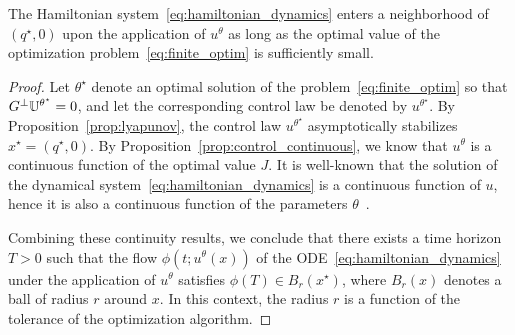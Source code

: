 \begin{prop}
    The Hamiltonian system~\eqref{eq:hamiltonian_dynamics} enters a neighborhood
    of $(q^\star, 0)$ upon the application of $u^\theta$ as long as the optimal
    value of the optimization problem~\eqref{eq:finite_optim} is sufficiently small.
    \label{prop:continuity_neighborhood}
\end{prop}

\begin{proof}
    Let $\theta^\star$ denote an optimal solution of the
    problem~\eqref{eq:finite_optim} so that $G^{\perp} \mathbb{U}^{\theta^\star} = 0$,
    and let the corresponding control law be denoted by $u^{\theta^\star}$.
    By Proposition~\ref{prop:lyapunov}, the control law $u^{\theta^\star}$
    asymptotically stabilizes $x^\star = (q^\star, 0)$.  
    By Proposition~\ref{prop:control_continuous}, we know that $u^\theta$ is a
    continuous function of the optimal value $J$.
    It is well-known that the solution of the dynamical
    system~\eqref{eq:hamiltonian_dynamics} is a continuous function of $u$,
    hence it is also a continuous function of the parameters
    $\theta$~\cite{hartman2002ordinary}.

    Combining these continuity results, we conclude that there exists a time
    horizon $T > 0$ such that the flow $\phi \left( t; u^\theta(x) \right)$ of
    the ODE~\eqref{eq:hamiltonian_dynamics} under the application of $u^\theta$
    satisfies $ \phi ( T ) \in B_r(x^\star)$, where $B_r(x)$ denotes a ball
    of radius $r$ around $x$. In this context, the radius $r$ is a function of
    the tolerance of the optimization algorithm.
\end{proof}



